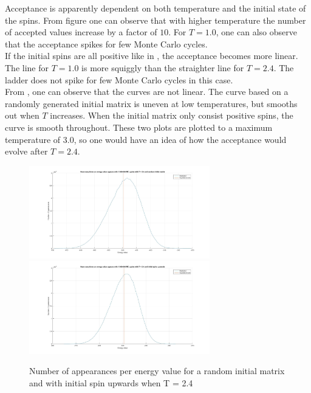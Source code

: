 \documentclass[10pt,a4paper]{article}
\begin{document}
\noindent Acceptance is apparently dependent on both temperature and the initial state of the spins. From figure  one can observe that with higher temperature the number of accepted values increase by a factor of $10$. For $T = 1.0$, one can also observe that the acceptance spikes for few Monte Carlo cycles. 
\\
If the initial spins are all positive like in , the acceptance becomes more linear. The line for $T = 1.0$ is more squiggly than the straighter line for $T = 2.4$. The ladder does not spike for few Monte Carlo cycles in this case.
\\
From , one can observe that the curves are not linear. The curve based on a randomly generated initial matrix is uneven at low temperatures, but smooths out when $T$ increases. When the initial matrix only consist positive spins, the curve is smooth throughout. These two plots are plotted to a maximum temperature of $3.0$, so one would have an idea of how the acceptance would evolve after $T = 2.4$. 

\begin{figure}
\centerline{
\includegraphics[width=0.7\textwidth]{energyappearanceT24random}
\includegraphics[width=0.7\textwidth]{energyappearanceT24upspin}
}
\caption{Number of appearances per energy value for a random initial matrix and with initial spin upwards when T = 2.4}
\label{fig:energyappearance}
\end{figure}
\end{document}
